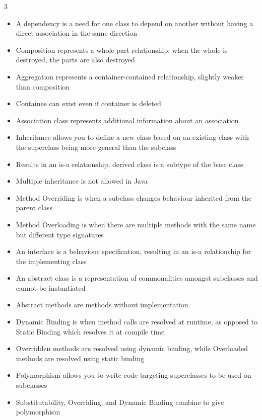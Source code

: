 \documentclass[10pt, landscape]{article}
\begin{document}
\begin{multicols*}{3}
\begin{itemize}
    \item A dependency is a need for one class to depend on another without having a direct association in the same direction
    \item Composition represents a whole-part relationship; when the whole is destroyed, the parts are also destroyed
    \item Aggregation represents a container-contained relationship, slightly weaker than composition
    \item Containee can exist even if container is deleted
    \item Association class represents additional information about an association
    \item Inheritance allows you to define a new class based on an existing class with the superclass being more general than the subclass
    \item Results in an is-a relationship, derived class is a subtype of the base class
    \item Multiple inheritance is not allowed in Java
    \item Method Overriding is when a subclass changes behaviour inherited from the parent class
    \item Method Overloading is when there are multiple methods with the same name but different type signatures
    \item An interface is a behaviour specification, resulting in an is-a relationship for the implementing class
    \item An abstract class is a representation of commonalities amongst subclasses and cannot be instantiated
    \item Abstract methods are methods without implementation
    \item Dynamic Binding is when method calls are resolved at runtime, as opposed to Static Binding which resolves it at compile time
    \item Overridden methods are resolved using dynamic binding, while Overloaded methods are resolved using static binding
    \item Polymorphism allows you to write code targeting superclasses to be used on subclasses
    \item Substitutability, Overriding, and Dynamic Binding combine to give polymorphism
\end{itemize}


\end{multicols*}
\end{document}
